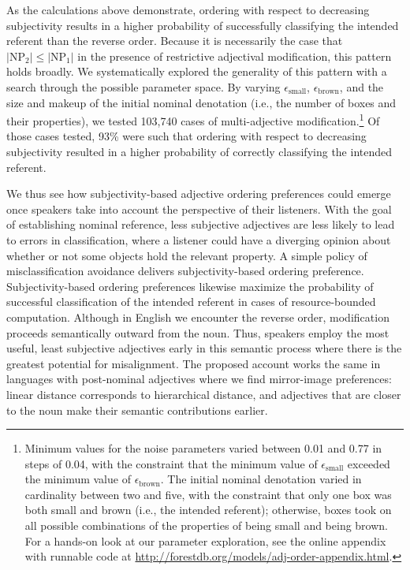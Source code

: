 \documentclass{sp}
\begin{document}
As the calculations above demonstrate, ordering with respect to decreasing subjectivity results in a higher probability of successfully classifying the intended referent than the reverse order. Because it is necessarily the case that $|\textrm{NP}_2| \leq |\textrm{NP}_1|$ in the presence of restrictive adjectival modification, this pattern holds broadly.  
We systematically explored the generality of this pattern with a search through the possible parameter space. By varying $\epsilon_{\textrm{small}}$, $\epsilon_{\textrm{brown}}$, and the size and makeup of the initial nominal denotation (i.e., the number of boxes and their properties), we tested 103,740 cases of multi-adjective modification.\footnote{Minimum values for the noise parameters varied between 0.01 and 0.77 in steps of 0.04, with the constraint that the minimum value of $\epsilon_{\textrm{small}}$ exceeded the minimum value of $\epsilon_{\textrm{brown}}$. The initial nominal denotation varied in cardinality between two and five, with the constraint that only one box was both small and brown (i.e., the intended referent); otherwise, boxes took on all possible combinations of the properties of being small and being brown. For a hands-on look at our parameter exploration, see the online appendix with runnable code at \href{http://forestdb.org/models/adj-order-appendix.html}{http://forestdb.org/models/adj-order-appendix.html}.} Of those cases tested, 93\% were such that ordering with respect to decreasing subjectivity resulted in a higher probability of correctly classifying the intended referent. 

We thus see how subjectivity-based adjective ordering preferences could emerge once speakers take into account the perspective of their listeners. With the goal of establishing nominal reference, less subjective adjectives are less likely to lead to errors in classification, where a listener could have a diverging opinion about whether or not some objects hold the relevant property. A simple policy of misclassification avoidance delivers subjectivity-based ordering preference. 
Subjectivity-based ordering preferences likewise maximize the probability of successful classification of the intended referent in cases of resource-bounded computation. 
Although in English we encounter the reverse order, modification proceeds semantically outward from the noun. Thus, speakers employ the most useful, least subjective adjectives early in this semantic process where there is the greatest potential for misalignment. 
The proposed account works the same in languages with post-nominal adjectives where we find mirror-image preferences: linear distance corresponds to hierarchical distance, and adjectives that are closer to the noun make their semantic contributions earlier.
\end{document}
